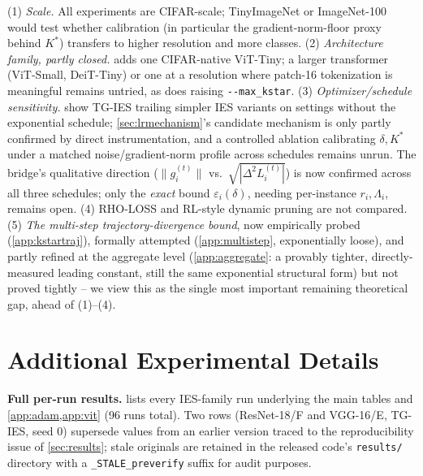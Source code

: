 \documentclass{article}
\theoremstyle{plain}
\theoremstyle{definition}
\theoremstyle{remark}
\begin{document}
(1) \emph{Scale.} All experiments are CIFAR-scale; TinyImageNet or ImageNet-100 would test whether calibration (in particular the gradient-norm-floor proxy behind $K^*$) transfers to higher resolution and more classes. (2) \emph{Architecture family, partly closed.}  adds one CIFAR-native ViT-Tiny; a larger transformer (ViT-Small, DeiT-Tiny) or one at a resolution where patch-16 tokenization is meaningful remains untried, as does raising \texttt{-{}-max\_kstar}. (3) \emph{Optimizer/schedule sensitivity.}  show TG-IES trailing simpler IES variants on settings without the exponential schedule; \cref{sec:lrmechanism}'s candidate mechanism is only partly confirmed by direct instrumentation, and a controlled ablation calibrating $\delta,K^*$ under a matched noise/gradient-norm profile across schedules remains unrun. The bridge's qualitative direction ($\|g_i^{(t)}\|$ vs.\ $\sqrt{|\Delta^2L_i^{(t)}|}$) is now confirmed across all three schedules; only the \emph{exact} bound $\varepsilon_i(\delta)$, needing per-instance $r_i,\Lambda_i$, remains open. (4) RHO-LOSS \citep{mindermann2022prioritized} and RL-style dynamic pruning \citep{zhu2026dppo} are not compared. (5) \emph{The multi-step trajectory-divergence bound}, now empirically probed (\cref{app:kstartraj}), formally attempted (\cref{app:multistep}, exponentially loose), and partly refined at the aggregate level (\cref{app:aggregate}: a provably tighter, directly-measured leading constant, still the same exponential structural form) but not proved tightly -- we view this as the single most important remaining theoretical gap, ahead of (1)--(4).

\section{Additional Experimental Details}
\label{app:experiment}

\textbf{Full per-run results.}  lists every IES-family run underlying the main tables and \cref{app:adam,app:vit} (96 runs total). Two rows (ResNet-18/F and VGG-16/E, TG-IES, seed 0) supersede values from an earlier version traced to the reproducibility issue of \cref{sec:results}; stale originals are retained in the released code's \texttt{results/} directory with a \texttt{\_STALE\_preverify} suffix for audit purposes.
\end{document}
